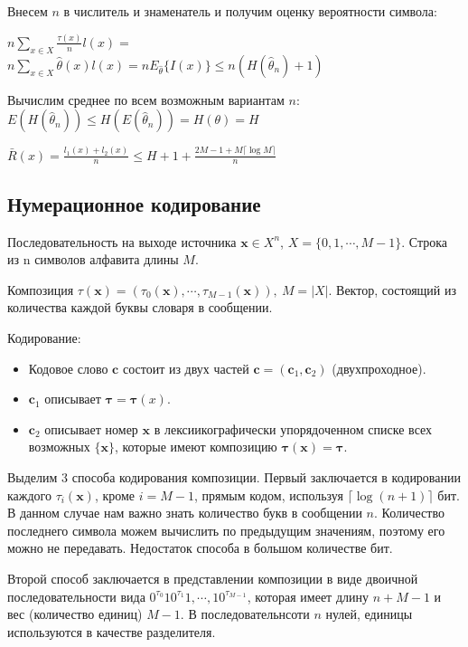 {Внесем $n$ в числитель и знаменатель и получим оценку вероятности символа:

$n \sum_{x \in X} \frac{\tau(x)}{n} l(x) =$\\
$n \sum_{x \in X} \hat \theta(x) l(x) = 
nE_{\hat \theta} \{I(x)\} \leq n(H(\hat \theta_n) + 1)$

Вычислим среднее по всем возможным вариантам $n$:
$E(H(\hat \theta_n)) \leq H(E(\hat \theta_n)) = H(\theta) = H$

$\bar R(x) = \frac{l_1(x) + l_2(x)}{n} \leq H + 1 + \frac{2M - 1 + M \lceil
\log M \rceil}{n}$

\subsection{Нумерационное кодирование}

Последовательность на выходе источника $\bm{x} \in X^n$, 
$X = \{0, 1, \cdots, M - 1\}$. Строка из n символов алфавита длины $M$.

Композиция $\tau(\bm{x}) = (\tau_0(\bm{x}), \cdots, \tau_{M - 1}(\bm{x})),\ M =
|X|$. Вектор, состоящий из количества каждой буквы словаря в сообщении.

Кодирование:
\begin{itemize}
    \item Кодовое слово $\bm{c}$ состоит из двух частей
        $\bm{c} = (\bm{c}_1, \bm{c}_2)$ (двухпроходное).

    \item  $\bm{c}_1$ описывает $\bm{\tau} =
\bm{\tau}(x)$.

    \item  $\bm{c}_2$ описывает номер $\bm{x}$ в лексиикографически
упорядоченном списке всех возможных $\{\bm{x}\}$, которые имеют композицию
$\bm{\tau}(\bm{x}) = \bm{\tau}$. 
\end{itemize}

Выделим 3 способа кодирования композиции. Первый заключается в кодировании
каждого $\tau_i(\bm{x})$, кроме $i = M - 1$, прямым кодом, используя $\lceil
\log(n + 1) \rceil$ бит. В данном случае нам важно знать количество букв в
сообщении $n$. Количество последнего символа можем вычислить по предыдущим
значениям, поэтому его можно не передавать. Недостаток способа в большом
количестве бит.

Второй способ заключается в представлении композиции в виде двоичной
последовательности вида $0^{\tau_0}10^{\tau_1}1, \cdots, 10^{\tau_{M-1}}$,
которая имеет длину $n + M - 1$ и вес (количество единиц) $M - 1$. В
последовательнсоти $n$ нулей, единицы используются в качестве разделителя.

}
